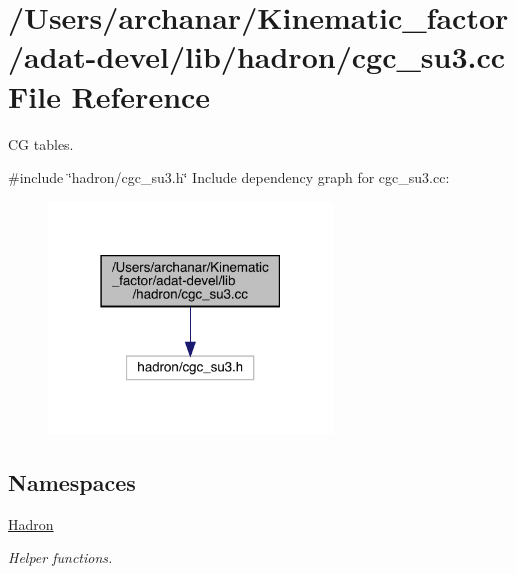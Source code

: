 \hypertarget{adat-devel_2lib_2hadron_2cgc__su3_8cc}{}\section{/\+Users/archanar/\+Kinematic\+\_\+factor/adat-\/devel/lib/hadron/cgc\+\_\+su3.cc File Reference}
\label{adat-devel_2lib_2hadron_2cgc__su3_8cc}


CG tables.  


{\ttfamily \#include \char`\"{}hadron/cgc\+\_\+su3.\+h\char`\"{}}\newline
Include dependency graph for cgc\+\_\+su3.\+cc\+:
\nopagebreak
\begin{figure}[H]
\begin{center}
\leavevmode
\includegraphics[width=214pt]{db/d57/adat-devel_2lib_2hadron_2cgc__su3_8cc__incl}
\end{center}
\end{figure}
\subsection*{Namespaces}
\begin{DoxyCompactItemize}
\item 
 \mbox{\hyperlink{namespaceHadron}{Hadron}}
\begin{DoxyCompactList}\small\item\em Helper functions. \end{DoxyCompactList}\end{DoxyCompactItemize}
